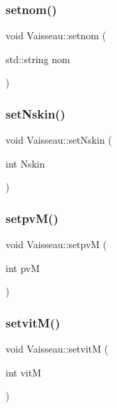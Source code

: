 \mbox{\label{class_vaisseau_a46174e710a959996ac9ae56f11757e61}} 
\subsubsection{\texorpdfstring{setnom()}{setnom()}}
{\footnotesize\ttfamily void Vaisseau\+::setnom (\begin{DoxyParamCaption}\item[{std\+::string}]{nom }\end{DoxyParamCaption})\hspace{0.3cm}{\ttfamily [inline]}}

\mbox{\label{class_vaisseau_a0d57458dc32dde2d8326c20f25172bab}} 
\subsubsection{\texorpdfstring{set\+Nskin()}{setNskin()}}
{\footnotesize\ttfamily void Vaisseau\+::set\+Nskin (\begin{DoxyParamCaption}\item[{int}]{Nskin }\end{DoxyParamCaption})\hspace{0.3cm}{\ttfamily [inline]}}

\mbox{\label{class_vaisseau_a10a33c8fed1bb1530148e98313d80a87}} 
\subsubsection{\texorpdfstring{setpv\+M()}{setpvM()}}
{\footnotesize\ttfamily void Vaisseau\+::setpvM (\begin{DoxyParamCaption}\item[{int}]{pvM }\end{DoxyParamCaption})\hspace{0.3cm}{\ttfamily [inline]}}

\mbox{\label{class_vaisseau_a5816b1761b1d6f12f2ee3077b938392a}} 
\subsubsection{\texorpdfstring{setvit\+M()}{setvitM()}}
{\footnotesize\ttfamily void Vaisseau\+::setvitM (\begin{DoxyParamCaption}\item[{int}]{vitM }\end{DoxyParamCaption})\hspace{0.3cm}{\ttfamily [inline]}}



